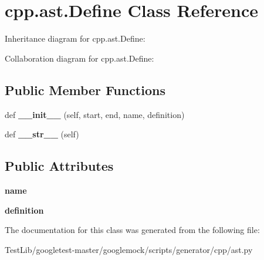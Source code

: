 \hypertarget{classcpp_1_1ast_1_1Define}{}\section{cpp.\+ast.\+Define Class Reference}
\label{classcpp_1_1ast_1_1Define}


Inheritance diagram for cpp.\+ast.\+Define\+:


Collaboration diagram for cpp.\+ast.\+Define\+:
\subsection*{Public Member Functions}
\begin{DoxyCompactItemize}
\item 
\mbox{\label{classcpp_1_1ast_1_1Define_ae9af61866e010a863ba9f8818ec8924c}} 
def {\bfseries \+\_\+\+\_\+init\+\_\+\+\_\+} (self, start, end, name, definition)
\item 
\mbox{\label{classcpp_1_1ast_1_1Define_aa89732914b19901c8d291e11f34bb627}} 
def {\bfseries \+\_\+\+\_\+str\+\_\+\+\_\+} (self)
\end{DoxyCompactItemize}
\subsection*{Public Attributes}
\begin{DoxyCompactItemize}
\item 
\mbox{\label{classcpp_1_1ast_1_1Define_a8879216f09e88f79d7baa49bcfa10ebd}} 
{\bfseries name}
\item 
\mbox{\label{classcpp_1_1ast_1_1Define_a0c636652dfeb2f15e62793afea1153c9}} 
{\bfseries definition}
\end{DoxyCompactItemize}


The documentation for this class was generated from the following file\+:\begin{DoxyCompactItemize}
\item 
Test\+Lib/googletest-\/master/googlemock/scripts/generator/cpp/ast.\+py\end{DoxyCompactItemize}
